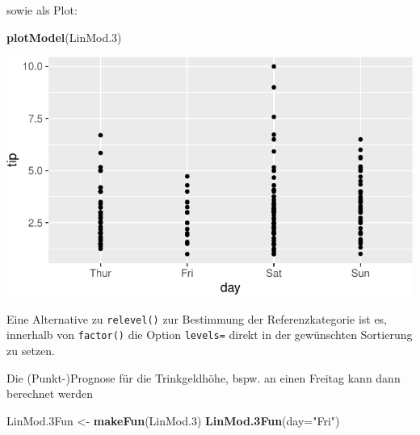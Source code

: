 \documentclass[12pt,ngerman,paper=a4,pagesize,DIV=13]{scrreprt}
\newenvironment{Shaded}{\begin{snugshade}}{\end{snugshade}}
\newcommand{\DataTypeTok}[1]{\textcolor[rgb]{0.13,0.29,0.53}{#1}}
\newcommand{\FloatTok}[1]{\textcolor[rgb]{0.00,0.00,0.81}{#1}}
\newcommand{\KeywordTok}[1]{\textcolor[rgb]{0.13,0.29,0.53}{\textbf{#1}}}
\newcommand{\NormalTok}[1]{#1}
\newcommand{\OperatorTok}[1]{\textcolor[rgb]{0.81,0.36,0.00}{\textbf{#1}}}
\newcommand{\StringTok}[1]{\textcolor[rgb]{0.31,0.60,0.02}{#1}}
\begin{document}
sowie als Plot:

\begin{Shaded}
\begin{Highlighting}[]
\KeywordTok{plotModel}\NormalTok{(LinMod}\FloatTok{.3}\NormalTok{)}
\end{Highlighting}
\end{Shaded}

\includegraphics{DatenerhebungStatistik-Uebung_files/figure-latex/unnamed-chunk-174-1.pdf}

Eine Alternative zu \texttt{relevel()} zur Bestimmung der
Referenzkategorie ist es, innerhalb von \texttt{factor()} die Option
\texttt{levels=} direkt in der gewünschten Sortierung zu setzen.

\begin{Shaded}
\end{Shaded}

Die (Punkt-)Prognose für die Trinkgeldhöhe, bspw. an einen Freitag kann
dann berechnet werden

\begin{Shaded}
\begin{Highlighting}[]
\NormalTok{LinMod}\FloatTok{.3}\NormalTok{Fun <-}\StringTok{ }\KeywordTok{makeFun}\NormalTok{(LinMod}\FloatTok{.3}\NormalTok{)}
\KeywordTok{LinMod.3Fun}\NormalTok{(}\DataTypeTok{day=}\StringTok{"Fri"}\NormalTok{)}
\end{Highlighting}
\end{Shaded}
\end{document}
